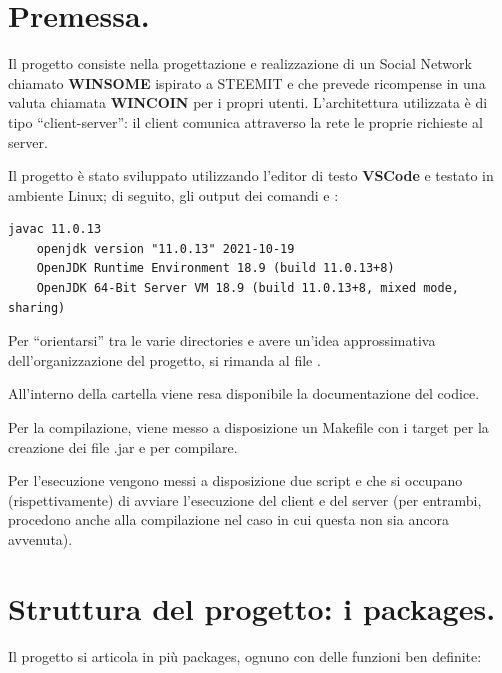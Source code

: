 \documentclass[11pt, italian, openany]{book}
\begin{document}
\begin{sloppypar}
\section*{Premessa.}
Il progetto consiste nella progettazione e realizzazione di un Social Network chiamato \textbf{WINSOME} ispirato a STEEMIT e che prevede
ricompense in una valuta chiamata \textbf{WINCOIN} per i propri utenti. L'architettura utilizzata \`e di tipo ``client-server'': il client
comunica attraverso la rete le proprie richieste al server.

Il progetto \`e stato sviluppato utilizzando l'editor di testo \textbf{VSCode} e testato in ambiente Linux; di seguito, gli output dei comandi
 e :
\begin{lstlisting}[style=code]
	javac 11.0.13
	openjdk version "11.0.13" 2021-10-19
	OpenJDK Runtime Environment 18.9 (build 11.0.13+8)
	OpenJDK 64-Bit Server VM 18.9 (build 11.0.13+8, mixed mode, sharing)
\end{lstlisting}
Per ``orientarsi'' tra le varie directories e avere un'idea approssimativa dell'organizzazione del progetto, si rimanda al file
.

All'interno della cartella  viene resa disponibile la documentazione del codice.

Per la compilazione, viene messo a disposizione un Makefile con i target  per la creazione dei file .jar e  per
compilare.

Per l'esecuzione vengono messi a disposizione due script  e  che si occupano (rispettivamente)
di avviare l'esecuzione del client e del server (per entrambi, procedono anche alla compilazione nel caso in cui questa non sia ancora
avvenuta).

\section*{Struttura del progetto: i packages.}
Il progetto si articola in pi\`u packages, ognuno con delle funzioni ben definite:

\end{sloppypar}
\end{document}
